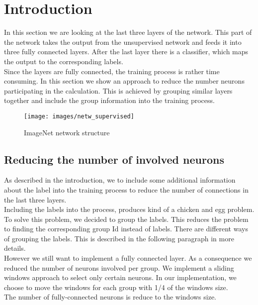 \section{Introduction}

In this section we are looking at the last three layers of the network. This part of the network takes the output from the unsupervised network and feeds it into three fully connected layers. After the last layer there is a classifier, which maps the output to the corresponding labels. \\
Since the layers are fully connected, the training process is rather time consuming. In this section we show an approach to reduce the number neurons participating in the calculation. This is achieved by grouping similar layers together and include the group information into the training process. 

\begin{figure}[hbtp]\centering
\texttt{[image: images/netw\_supervised]}
\caption{ImageNet network structure}
\label{fig:net1_supervised}
\end{figure}



\subsection{Reducing the number of involved neurons }
As described in the introduction, we to include some additional information about the label into the training process to reduce the number of connections in the last three layers. \\
Including the labels into the process, produces kind of a chicken and egg problem. To solve this problem, we decided to group the labels. This reduces the problem to finding the corresponding group Id instead of labels. There are different ways of grouping the labels. This is described in the following paragraph in more details. \\
However we still want to implement a fully connected layer. As a consequence we reduced the number of neurons involved per group. We implement a sliding windows approach to select only certain neurons. In our implementation, we choose to move the windows for each group with 1/4 of the windows size. \\
The number of fully-connected neurons is reduce to the windows size.

